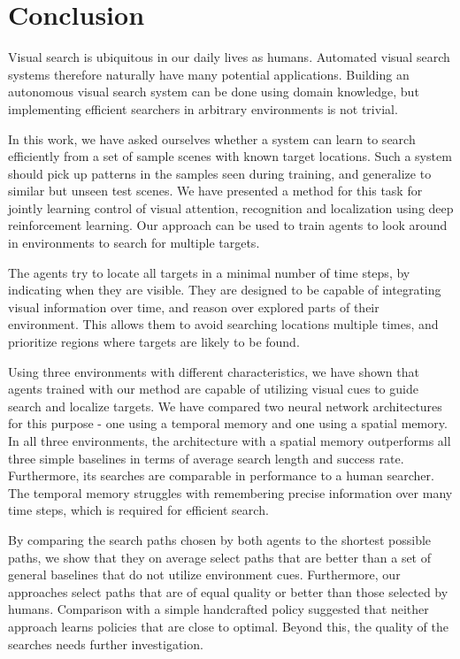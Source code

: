 \chapter{Conclusion}
\label{cha:conclusion}

Visual search is ubiquitous in our daily lives as humans.
Automated visual search systems therefore naturally have many potential applications.
Building an autonomous visual search system can be done using domain knowledge, but implementing efficient searchers in arbitrary environments is not trivial.

In this work, we have asked ourselves whether a system can learn to search efficiently from a set of sample scenes with known target locations.
Such a system should pick up patterns in the samples seen during training, and generalize to similar but unseen test scenes.
We have presented a method for this task for jointly learning control of visual attention, recognition and localization using deep reinforcement learning.
Our approach can be used to train agents to look around in environments to search for multiple targets.

The agents try to locate all targets in a minimal number of time steps, by indicating when they are visible.
They are designed to be capable of integrating visual information over time, and reason over explored parts of their environment.
This allows them to avoid searching locations multiple times, and prioritize regions where targets are likely to be found.

Using three environments with different characteristics, we have shown that agents trained with our method are capable of utilizing visual cues to guide search and localize targets.
We have compared two neural network architectures for this purpose - one using a temporal memory and one using a spatial memory.
In all three environments, the architecture with a spatial memory outperforms all three simple baselines in terms of average search length and success rate.
Furthermore, its searches are comparable in performance to a human searcher.
The temporal memory struggles with remembering precise information over many time steps, which is required for efficient search.

By comparing the search paths chosen by both agents to the shortest possible paths, we show that they on average select paths that are better than a set of general baselines that do not utilize environment cues.
Furthermore, our approaches select paths that are of equal quality or better than those selected by humans.
Comparison with a simple handcrafted policy suggested that neither approach learns policies that are close to optimal.
Beyond this, the quality of the searches needs further investigation.

